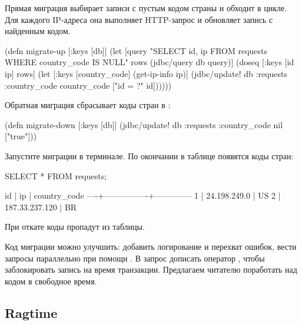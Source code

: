 Прямая миграция выбирает записи с пустым кодом страны и обходит в цикле. Для каждого IP-адреса она выполняет HTTP-запрос и обновляет запись с найденным кодом.

\begin{english}
  \begin{clojure}
(defn migrate-up [{:keys [db]}]
  (let [query "SELECT id, ip FROM requests
               WHERE country_code IS NULL"
        rows (jdbc/query db query)]
    (doseq [{:keys [id ip]} rows]
      (let [{:keys [country_code]} (get-ip-info ip)]
        (jdbc/update! db :requests
                      {:country_code country_code}
                      ["id = ?" id])))))
  \end{clojure}
\end{english}

Обратная миграция сбрасывает коды стран в :

\begin{english}
  \begin{clojure}
(defn migrate-down [{:keys [db]}]
  (jdbc/update! db :requests
                {:country_code nil}
                ["true"]))
  \end{clojure}
\end{english}

Запустите миграции в терминале. По окончании в таблице  появятся коды стран:

\begin{english}
  \begin{clojure}
SELECT * FROM requests;
  \end{clojure}
\end{english}

\begin{english}
  \begin{text}
 id |       ip       | country_code
----+----------------+--------------
  1 | 24.198.249.0   | US
  2 | 187.33.237.120 | BR
  \end{text}
\end{english}

При откате коды пропадут из таблицы.

Код миграции можно улучшить: добавить логирование и перехват ошибок, вести запросы параллельно при помощи . В запрос  дописать оператор , чтобы заблокировать запись на время транзакции. Предлагаем читателю поработать над кодом в свободное время.

\subsection{Ragtime}

